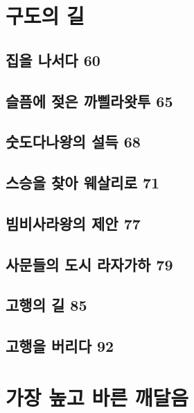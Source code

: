 \documentclass[12pt, a4paper, oneside]{book}
\let\stdsection\section
\renewcommand\section{\newpage\stdsection}
\begin{document}
	\chapter{구도의 길}
	\noptcrule
	\parttoc			


	\section{집을 나서다 60 }

	\section{슬픔에 젖은 까삘라왓투 65 }

	\section{숫도다나왕의 설득 68 }

	\section{스승을 찾아 웨살리로 71 }

	\section{빔비사라왕의 제안 77 }

	\section{사문들의 도시 라자가하 79 }

	\section{고행의 길 85 }

	\section{고행을 버리다 92	}





	\chapter{가장 높고 바른 깨달음}
	\noptcrule
	\parttoc				
\end{document}
